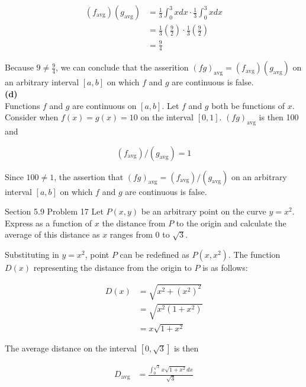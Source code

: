\documentclass{article}
\begin{document}
    \begin{align*}
        (f_{\text{avg}})(g_{\text{avg}})    &= \frac{1}{3}\int_0^3 xdx \cdot \frac{1}{3}\int_0^3 xdx \\
        &= \frac{1}{3}\left(\frac{9}{2}\right) \cdot \frac{1}{3}\left(\frac{9}{2}\right) \\
        &= \frac{9}{4}
    \end{align*}

    Because $9 \not = \frac{9}{4}$, we can conclude that the asserition $\left(fg\right)_{\text{avg}}=\left(f_{\text{avg}}\right)\left(g_\text{avg}\right)$ on an arbitrary interval $[a,b]$ on which $f$ and $g$ are
    continuous is false. \\

    \textbf{(d)} \\
    Functions $f$ and $g$ are continuous on $[a,b]$. Let $f$ and $g$ both be functions of $x$. Consider when $f(x)=g(x)=10$ on the interval $[0,1]$. $\left(fg\right)_{\text{avg}}$ is then 100 and

    \[
        \left(f_{\text{avg}}\right)/\left(g_{\text{avg}}\right) = 1
    \]

    Since $100\not = 1$, the assertion that $\left(fg\right)_{\text{avg}}=\left(f_{\text{avg}}\right)/\left(g_{\text{avg}}\right)$ on an arbitrary interval $[a,b]$ on which $f$ and $g$ are continuous is false.


    \begin{tbhtheorem}{Section 5.9 Problem 17}
        Let $P(x,y)$ be an arbitrary point on the curve $y=x^2$. Express as a function of $x$ the distance from $P$ to the origin and calculate the average of this distance as $x$ ranges from 0 to $\sqrt{3}$.
    \end{tbhtheorem}

    Substituting in $y=x^2$, point $P$ can be redefined as $P(x, x^2)$. The function $D(x)$ representing the distance from the origin to $P$ is as follows:

    \begin{align*}
        D(x)    &= \sqrt{x^2 + \left(x^2\right)^2} \\
                &= \sqrt{x^2(1+x^2)} \\
                &= x\sqrt{1+x^2}
    \end{align*}

    The average distance on the interval $[0, \sqrt{3}]$ is then

    \begin{align*}
        D_{\text{avg}}  &= \frac{\int_0^{\sqrt{3}} x\sqrt{1+x^2}dx}{\sqrt{3}}
    \end{align*}
\end{document}
